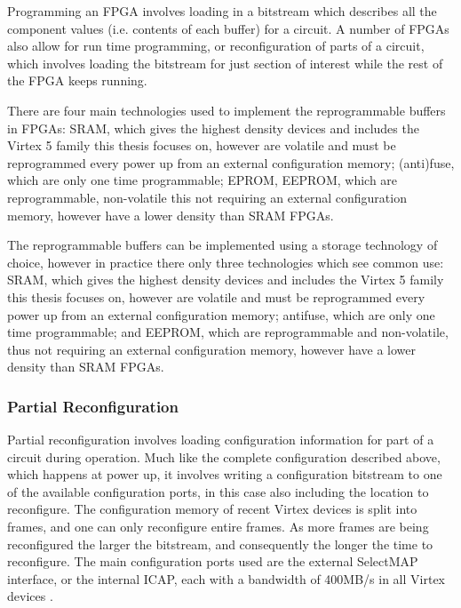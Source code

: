 \documentclass[12pt,drafta4paper,oneside]{memoir} %
\begin{document}
Programming an \ac{FPGA} involves loading in a bitstream which describes all the component values (i.e. contents of each buffer) for a circuit. A number of \acp{FPGA} also allow for run time programming, or reconfiguration of parts of a circuit, which involves loading the bitstream for just section of interest while the rest of the \ac{FPGA} keeps running.

There are four main technologies used to implement the reprogrammable buffers in \acp{FPGA}: \ac{SRAM}, which gives the highest density devices and includes the Virtex 5 family this thesis focuses on, however are volatile and must be reprogrammed every power up from an external configuration memory; (anti)fuse, which are only one time programmable; EPROM, \ac{EEPROM}, which are reprogrammable, non-volatile this not requiring an external configuration memory, however have a lower density than \ac{SRAM} \acp{FPGA}.

The reprogrammable buffers can be implemented using a storage technology of choice, however in practice there only three technologies which see common use: \ac{SRAM}, which gives the highest density devices and includes the Virtex 5 family this thesis focuses on, however are volatile and must be reprogrammed every power up from an external configuration memory; antifuse, which are only one time programmable; and \ac{EEPROM}, which are reprogrammable and non-volatile, thus not requiring an external configuration memory, however have a lower density than \ac{SRAM} \acp{FPGA}. 

\subsubsection{Partial Reconfiguration}
Partial reconfiguration involves loading configuration information for part of a circuit during operation. Much like the complete configuration described above, which happens at power up, it involves writing a configuration bitstream to one of the available configuration ports, in this case also including the location to reconfigure. The configuration memory of recent Virtex devices is split into frames, and one can only reconfigure entire frames. As more frames are being reconfigured the larger the bitstream, and consequently the longer the time to reconfigure. The main configuration ports used are the external SelectMAP interface, or the internal \ac{ICAP}, each with a bandwidth of 400MB/s in all Virtex devices .
\end{document}
